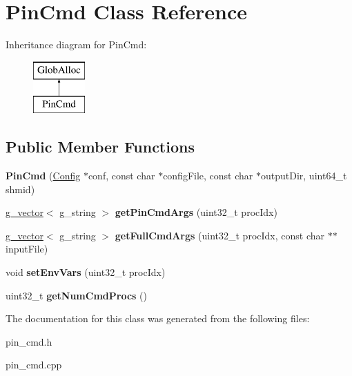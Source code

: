 \hypertarget{classPinCmd}{\section{Pin\-Cmd Class Reference}
\label{classPinCmd}
}
Inheritance diagram for Pin\-Cmd\-:\begin{figure}[H]
\begin{center}
\leavevmode
\includegraphics[height=2.000000cm]{classPinCmd}
\end{center}
\end{figure}
\subsection*{Public Member Functions}
\begin{DoxyCompactItemize}
\item 
\hypertarget{classPinCmd_a77710658061bc8e9e4def5205c1f2569}{{\bfseries Pin\-Cmd} (\hyperlink{classConfig}{Config} $\ast$conf, const char $\ast$config\-File, const char $\ast$output\-Dir, uint64\-\_\-t shmid)}\label{classPinCmd_a77710658061bc8e9e4def5205c1f2569}

\item 
\hypertarget{classPinCmd_a91248a568edb9c0083297441aeb5e8e3}{\hyperlink{classg__vector}{g\-\_\-vector}$<$ g\-\_\-string $>$ {\bfseries get\-Pin\-Cmd\-Args} (uint32\-\_\-t proc\-Idx)}\label{classPinCmd_a91248a568edb9c0083297441aeb5e8e3}

\item 
\hypertarget{classPinCmd_a483de8c3bd3b0c12ac290e207133bcd7}{\hyperlink{classg__vector}{g\-\_\-vector}$<$ g\-\_\-string $>$ {\bfseries get\-Full\-Cmd\-Args} (uint32\-\_\-t proc\-Idx, const char $\ast$$\ast$input\-File)}\label{classPinCmd_a483de8c3bd3b0c12ac290e207133bcd7}

\item 
\hypertarget{classPinCmd_ab030b2e5fd5b364de12e1ccc8430a417}{void {\bfseries set\-Env\-Vars} (uint32\-\_\-t proc\-Idx)}\label{classPinCmd_ab030b2e5fd5b364de12e1ccc8430a417}

\item 
\hypertarget{classPinCmd_a75428013a86959e36f6ea6b1918c5e40}{uint32\-\_\-t {\bfseries get\-Num\-Cmd\-Procs} ()}\label{classPinCmd_a75428013a86959e36f6ea6b1918c5e40}

\end{DoxyCompactItemize}


The documentation for this class was generated from the following files\-:\begin{DoxyCompactItemize}
\item 
pin\-\_\-cmd.\-h\item 
pin\-\_\-cmd.\-cpp\end{DoxyCompactItemize}
